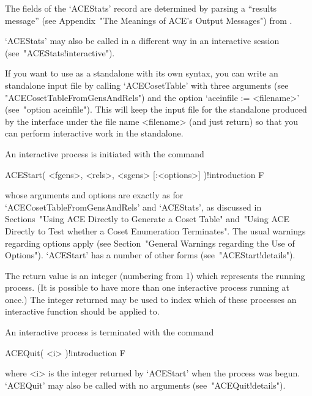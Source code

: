 The fields of the  `ACEStats'  record  are  determined  by  parsing  a
``results  message''  (see  Appendix~"The  Meanings  of  ACE's  Output
Messages") from {\ACE}.

`ACEStats' may also be called in a different  way  in  an  interactive
{\ACE} session (see~"ACEStats!interactive").


If you want to use {\ACE} as a standalone with its own syntax, you can
write an {\ACE} standalone input file by calling `ACECosetTable'  with
three arguments (see "ACECosetTableFromGensAndRels")  and  the  option
`aceinfile := <filename>' (see~"option aceinfile"). This will keep the
input file for the {\ACE} standalone produced by the {\GAP}  interface
under the file name <filename> (and  just  return)  so  that  you  can
perform interactive work in the standalone.


An interactive {\ACE} process is initiated with the command

\>ACEStart( <fgens>, <rels>, <sgens> [:<options>] )!{introduction} F

whose    arguments    and    options    are     exactly     as     for
`ACECosetTableFromGensAndRels'  and  `ACEStats',   as   discussed   in
Sections~"Using ACE Directly to Generate a Coset Table" and~"Using ACE
Directly to Test whether a Coset Enumeration  Terminates".  The  usual
warnings  regarding  options  apply  (see  Section~"General   Warnings
regarding the Use of Options"). `ACEStart' has a number of other forms
(see~"ACEStart!details").

The return value is an integer (numbering from 1) which represents the
running process. (It is possible to have  more  than  one  interactive
process running at once.) The integer returned may be  used  to  index
which of these processes an  interactive  {\ACE}  function  should  be
applied to.

An interactive {\ACE} process is terminated with the command

\>ACEQuit( <i> )!{introduction} F

where <i> is the integer returned by `ACEStart' when the  process  was
begun.   `ACEQuit'   may   also   be   called   with   no    arguments
(see~"ACEQuit!details").

